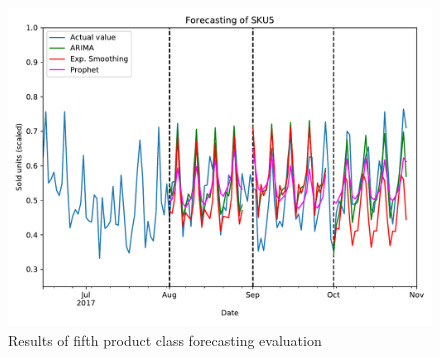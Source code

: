 \documentclass[11pt,a4paper]{article}
\begin{document}
\begin{figure}
  \includegraphics[width=1.2\linewidth]{figures/SKU5_all.pdf}
  \caption{Results of fifth product class forecasting evaluation}
  \label{fig:sku5_all}
\end{figure}


\newpage
\clearpage


\newpage
\listoffigures
\newpage
\listoftables
\end{document}
